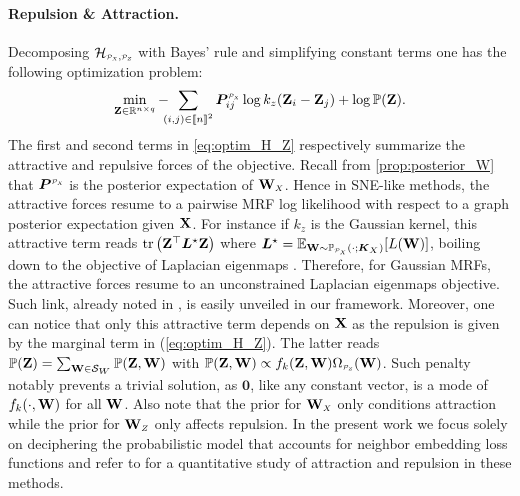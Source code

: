 \paragraph{Repulsion \& Attraction.}
Decomposing $\mathcal{H}_{\scaleto{\mathcal{P}_X}{4pt}, \scaleto{\mathcal{P}_Z}{4pt}}$ with Bayes' rule and simplifying constant terms one has the following optimization problem: 
\begin{align}\label{eq:optim_H_Z}
    \min_{\Zb \in \mathbb{R}^{n \times q}} -\hspace{-0.2cm}\sum_{(i,j) \in \integ{n}^2} \bm{P}^{\scaleto{\mathcal{P}_X}{4pt}}_{ij}\log k_z(\Zb_i - \Zb_j) + \log \mathbb{P}(\Zb).
\end{align}
The first and second terms in \cref{eq:optim_H_Z} respectively summarize the attractive and repulsive forces of the objective. Recall from \cref{prop:posterior_W}
that $\bm{P}^{\scaleto{\mathcal{P}_X}{4pt}}$ is the posterior expectation of $\Wb_{\scaleto{X}{4pt}}$. Hence in SNE-like methods, the attractive forces resume to a pairwise MRF log likelihood with respect to a graph posterior expectation given $\mathbf{X}$. For instance if $k_z$ is the Gaussian kernel, this attractive term reads $\operatorname{tr} \left(\mathbf{Z}^\top \bm{L}^\star \mathbf{Z} \right)$ where $\bm{L}^\star = \mathbb{E}_{\Wb \sim \mathbb{P}_{\scaleto{\mathcal{P}_X}{4pt}}(\cdot;\bm{K}_{\scaleto{X}{4pt}})}[L(\Wb)]$, boiling down to the objective of Laplacian eigenmaps \cite{belkin2003laplacian}. Therefore, for Gaussian MRFs, the attractive forces resume to an unconstrained Laplacian eigenmaps objective. Such link, already noted in \cite{carreira2010elastic}, is easily unveiled in our framework. Moreover, one can notice that only this attractive term depends on $\mathbf{X}$ as the repulsion is given by the marginal term in (\ref{eq:optim_H_Z}). The latter reads $\mathbb{P}(\Zb) = \sum_{\Wb \in \mathcal{S}_{\scaleto{W}{4pt}}} \mathbb{P}(\Zb, \Wb)$ with $\mathbb{P}(\Zb, \Wb) \propto f_k(\Zb, \Wb)\Omega_{\scaleto{\mathcal{P}_Z}{4pt}}(\Wb)$. Such penalty notably prevents a trivial solution, as $\bm{0}$, like any constant vector, is a mode of $f_k(\cdot, \mathbf{W})$ for all $\mathbf{W}$. Also note that the prior for $\Wb_{\scaleto{X}{4pt}}$ only conditions attraction while the prior for $\Wb_{\scaleto{Z}{4pt}}$ only affects repulsion. In the present work we focus solely on deciphering the probabilistic model that accounts for neighbor embedding loss functions and refer to \cite{bohm2020unifying} for a quantitative study of attraction and repulsion in these methods.

